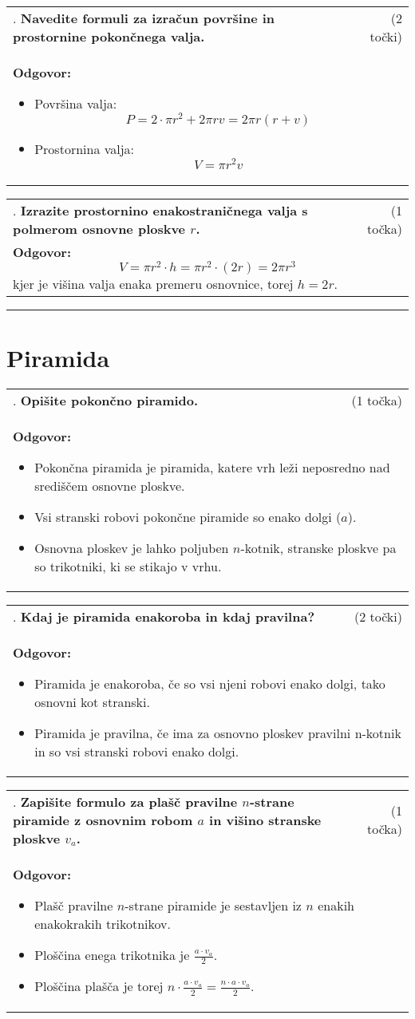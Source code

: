 \documentclass[12pt]{article}
\newcounter{vprasanje}[section]
\renewcommand{\thevprasanje}{\roman{vprasanje}}
\newcommand{\vprasanje}[2]{%
  \stepcounter{vprasanje}%
  \textbf{\thevprasanje}. \textbf{#1} & (#2) \\
}
\newcommand{\odgovor}[1]{%
  \multicolumn{2}{p{\dimexpr\textwidth-2\tabcolsep\relax}}{%
    \small \textbf{Odgovor:} #1%
  } \\[1em]%
}
\newcommand{\crta}{\rule{\textwidth}{0.4pt}}
\newcommand{\naslov}[1]{%
  \vspace{1em} 
  \section{#1}
  \addcontentsline{toc}{section}{\protect\numberline{}#1}%
}
\newcommand{\razmak}[1]{%
  \vspace{#1}
}
\begin{document}
\begin{tabularx}{\textwidth}{X r}
\vprasanje{Navedite formuli za izračun površine in prostornine pokončnega valja.}{2 točki}
\odgovor{
\begin{itemize}
  \item Površina valja: 
  \[
  P = 2 \cdot \pi r^2 + 2 \pi r v = 2\pi r (r + v)
  \]
  \item Prostornina valja:
  \[
  V = \pi r^2 v
  \]
\end{itemize}
}
\end{tabularx}

\begin{tabularx}{\textwidth}{X r}
\vprasanje{Izrazite prostornino enakostraničnega valja s polmerom osnovne ploskve $r$.}{1 točka}
\odgovor{
\[
V = \pi r^2 \cdot h = \pi r^2 \cdot (2r) = 2 \pi r^3
\]
kjer je višina valja enaka premeru osnovnice, torej $h = 2r$.
}
\end{tabularx}

\razmak{0.5em}


\crta

\naslov{Piramida}

\begin{tabularx}{\textwidth}{X r}
\vprasanje{Opišite pokončno piramido.}{1 točka}
\odgovor{
\begin{itemize}
  \item Pokončna piramida je piramida, katere vrh leži neposredno nad središčem osnovne ploskve.
  \item Vsi stranski robovi pokončne piramide so enako dolgi ($a$).
  \item Osnovna ploskev je lahko poljuben $n$-kotnik, stranske ploskve pa so trikotniki, ki se stikajo v vrhu.
\end{itemize}
}
\end{tabularx}

\begin{tabularx}{\textwidth}{X r}
\vprasanje{Kdaj je piramida enakoroba in kdaj pravilna?}{2 točki}
\odgovor{
\begin{itemize}
  \item Piramida je enakoroba, če so vsi njeni robovi enako dolgi, tako osnovni kot stranski.
  \item Piramida je pravilna, če ima za osnovno ploskev pravilni n-kotnik in so vsi stranski robovi enako dolgi.
\end{itemize}
}
\end{tabularx}


\begin{tabularx}{\textwidth}{X r}
\vprasanje{Zapišite formulo za plašč pravilne $n$-strane piramide z osnovnim robom $a$ in višino stranske ploskve $v_a$.}{1 točka}
\odgovor{
\begin{itemize}
  \item Plašč pravilne $n$-strane piramide je sestavljen iz $n$ enakih enakokrakih trikotnikov.
  \item Ploščina enega trikotnika je $\frac{a \cdot v_a}{2}$.
  \item Ploščina plašča je torej $n \cdot \frac{a \cdot v_a}{2} = \frac{n \cdot a \cdot v_a}{2}$.
\end{itemize}
}
\end{tabularx}
\end{document}

